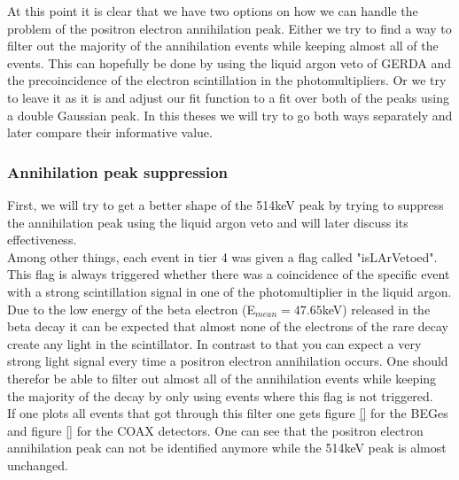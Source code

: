 At this point it is clear that we have two options on how we can handle the problem of the positron electron annihilation peak. 
Either we try to find a way to filter out the majority of the annihilation events while keeping almost all of the  events. 
This can hopefully be done by using the liquid argon veto of GERDA and the precoincidence of the electron scintillation in the photomultipliers. 
Or we try to leave it as it is and adjust our fit function to a fit over both of the peaks using a double Gaussian peak. 
In this theses we will try to go both ways separately and later compare their informative value.
\\

\subsubsection{Annihilation peak suppression}
\label{sec:APS}

First, we will try to get a better shape of the 514keV peak by trying to suppress the annihilation peak using the liquid argon veto and will later discuss its effectiveness.
\\

Among other things, each event in tier 4 was given a flag called "isLArVetoed".
This flag is always triggered whether there was a coincidence of the specific event with a strong scintillation signal in one of the photomultiplier in the liquid argon. 
Due to the low energy of the beta electron (E\(_{mean}=47.65\)keV) released in the beta decay it can be expected that almost none of the electrons of the rare  decay create any light in the scintillator. 
In contrast to that you can expect a very strong light signal every time a positron electron annihilation occurs. 
One should therefor be able to filter out almost all of the annihilation events while keeping the majority of the  decay by only using events where this flag is not triggered.
\\

If one plots all events that got through this filter one gets figure \ref{} for the BEGes and figure \ref{} for the COAX detectors.
One can see that the positron electron annihilation peak can not be identified anymore while the 514keV peak is almost unchanged.
\\

